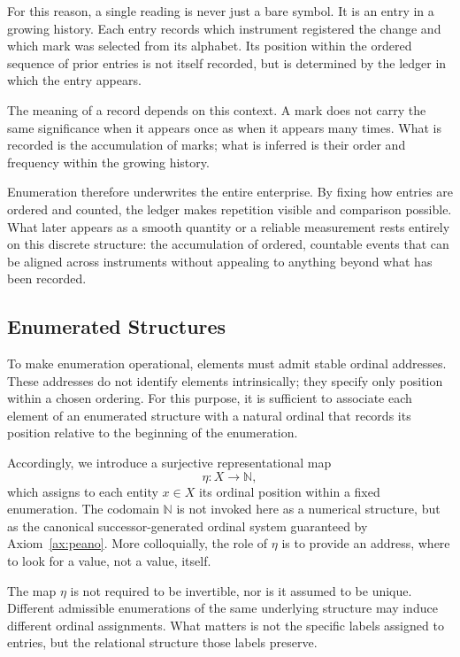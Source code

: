For this reason, a single reading is never just a bare symbol. It is an entry in a
growing history. Each entry records which instrument registered the change and
which mark was selected from its alphabet. Its position within the ordered
sequence of prior entries is not itself recorded, but is determined by the
ledger in which the entry appears.

The meaning of a record depends on this context. A mark does not carry the same
significance when it appears once as when it appears many times. What is
recorded is the accumulation of marks; what is inferred is their order and
frequency within the growing history.

Enumeration therefore underwrites the entire enterprise. By fixing how entries
are ordered and counted, the ledger makes repetition visible and comparison
possible. What later appears as a smooth quantity or a reliable measurement
rests entirely on this discrete structure: the accumulation of ordered,
countable events that can be aligned across instruments without appealing to
anything beyond what has been recorded.




\subsection{Enumerated Structures}

To make enumeration operational, elements must admit stable ordinal addresses.
These addresses do not identify elements intrinsically; they specify only
position within a chosen ordering.  For this purpose, it is sufficient to
associate each element of an enumerated structure with a natural ordinal that
records its position relative to the beginning of the enumeration.

Accordingly, we introduce a surjective representational map
\begin{equation}
\eta : X \to \mathbb{N},
\end{equation}
which assigns to each entity $x\in X$ its ordinal position within a fixed
enumeration.  The codomain $\mathbb{N}$ is not invoked here as a numerical
structure, but as the canonical successor-generated ordinal system guaranteed
by Axiom~\ref{ax:peano}.  More colloquially, the role of $\eta$ is to provide an 
address, where to look for a value, not a value, itself.

The map $\eta$ is not required to be invertible, nor is it assumed to be unique.
Different admissible enumerations of the same underlying structure may induce
different ordinal assignments. What matters is not the specific labels assigned
to entries, but the relational structure those labels preserve.

